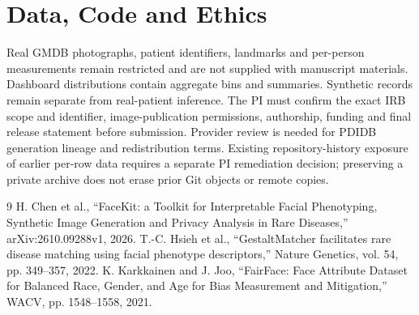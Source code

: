 \documentclass[11pt]{article}
\begin{document}
\section{Data, Code and Ethics}
Real GMDB photographs, patient identifiers, landmarks and per-person measurements remain restricted and are not supplied with manuscript materials. Dashboard distributions contain aggregate bins and summaries. Synthetic records remain separate from real-patient inference. The PI must confirm the exact IRB scope and identifier, image-publication permissions, authorship, funding and final release statement before submission. Provider review is needed for PDIDB generation lineage and redistribution terms. Existing repository-history exposure of earlier per-row data requires a separate PI remediation decision; preserving a private archive does not erase prior Git objects or remote copies.
\begin{thebibliography}{9}
 H. Chen et al., ``FaceKit: a Toolkit for Interpretable Facial Phenotyping, Synthetic Image Generation and Privacy Analysis in Rare Diseases,'' arXiv:2610.09288v1, 2026.
 T.-C. Hsieh et al., ``GestaltMatcher facilitates rare disease matching using facial phenotype descriptors,'' Nature Genetics, vol. 54, pp. 349--357, 2022.
 K. Karkkainen and J. Joo, ``FairFace: Face Attribute Dataset for Balanced Race, Gender, and Age for Bias Measurement and Mitigation,'' WACV, pp. 1548--1558, 2021.
\end{thebibliography}
\end{document}
